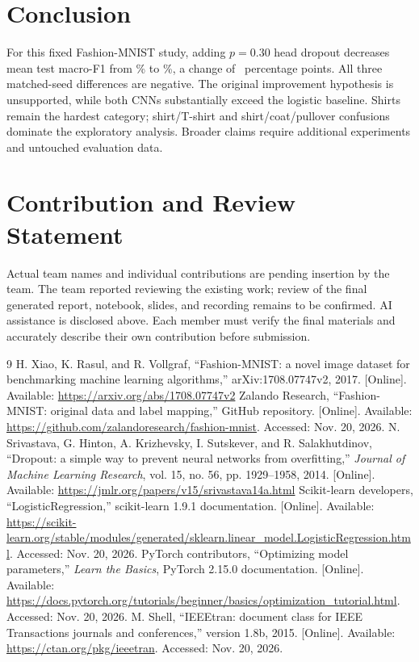 \documentclass[conference]{IEEEtran}
\begin{document}
\section{Conclusion}
For this fixed Fashion-MNIST study, adding $p=0.30$ head dropout decreases mean test macro-F1 from \PlainFone\% to \DropFone\%, a change of \MeanDelta\ percentage points. All three matched-seed differences are negative. The original improvement hypothesis is unsupported, while both CNNs substantially exceed the logistic baseline. Shirts remain the hardest category; shirt/T-shirt and shirt/coat/pullover confusions dominate the exploratory analysis. Broader claims require additional experiments and untouched evaluation data.

\section*{Contribution and Review Statement}
Actual team names and individual contributions are pending insertion by the team. The team reported reviewing the existing work; review of the final generated report, notebook, slides, and recording remains to be confirmed. AI assistance is disclosed above. Each member must verify the final materials and accurately describe their own contribution before submission.

\clearpage
\begin{thebibliography}{9}
 H. Xiao, K. Rasul, and R. Vollgraf, ``Fashion-MNIST: a novel image dataset for benchmarking machine learning algorithms,'' arXiv:1708.07747v2, 2017. [Online]. Available: \url{https://arxiv.org/abs/1708.07747v2}
 Zalando Research, ``Fashion-MNIST: original data and label mapping,'' GitHub repository. [Online]. Available: \url{https://github.com/zalandoresearch/fashion-mnist}. Accessed: Nov. 20, 2026.
 N. Srivastava, G. Hinton, A. Krizhevsky, I. Sutskever, and R. Salakhutdinov, ``Dropout: a simple way to prevent neural networks from overfitting,'' \emph{Journal of Machine Learning Research}, vol. 15, no. 56, pp. 1929--1958, 2014. [Online]. Available: \url{https://jmlr.org/papers/v15/srivastava14a.html}
 Scikit-learn developers, ``LogisticRegression,'' scikit-learn 1.9.1 documentation. [Online]. Available: \url{https://scikit-learn.org/stable/modules/generated/sklearn.linear_model.LogisticRegression.html}. Accessed: Nov. 20, 2026.
 PyTorch contributors, ``Optimizing model parameters,'' \emph{Learn the Basics}, PyTorch 2.15.0 documentation. [Online]. Available: \url{https://docs.pytorch.org/tutorials/beginner/basics/optimization_tutorial.html}. Accessed: Nov. 20, 2026.
 M. Shell, ``IEEEtran: document class for IEEE Transactions journals and conferences,'' version 1.8b, 2015. [Online]. Available: \url{https://ctan.org/pkg/ieeetran}. Accessed: Nov. 20, 2026.
\end{thebibliography}
\end{document}
